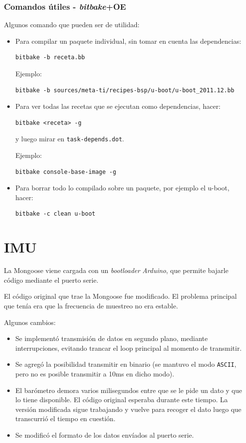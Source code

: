 \documentclass[main]{subfiles}
\begin{document}
\subsubsection{Comandos útiles - \textit{bitbake}+OE}
\label{sec:codigo:comandos-bitbake-oe}

Algunos comando que pueden ser de utilidad:

\begin{itemize}
\item Para compilar un paquete individual, sin tomar en cuenta las dependencias:
\begin{verbatim}
bitbake -b receta.bb
\end{verbatim}
Ejemplo:
\begin{verbatim}
bitbake -b sources/meta-ti/recipes-bsp/u-boot/u-boot_2011.12.bb
\end{verbatim}
\item Para ver todas las recetas que se ejecutan como dependencias, hacer:
\begin{verbatim}
bitbake <receta> -g
\end{verbatim}
y luego mirar en \verb+task-depends.dot+.

Ejemplo:
\begin{verbatim}
bitbake console-base-image -g
\end{verbatim}
\item Para borrar todo lo compilado sobre un paquete, por ejemplo el u-boot, hacer:
\begin{verbatim}
bitbake -c clean u-boot
\end{verbatim}
\end{itemize}

\section{IMU}
\label{sec:codigo:imu}

La Mongoose viene cargada con un \textit{bootloader} \textit{Arduino}, que permite bajarle código mediante el puerto serie.

El código original que trae la Mongoose fue modificado. El problema principal que tenía era que la frecuencia de muestreo no era estable.

Algunos cambios:
\begin{itemize}
\item Se implementó transmisión de datos en segundo plano, mediante interrupciones, evitando trancar el loop principal al momento de transmitir.
\item Se agregó la posibilidad transmitir en binario (se mantuvo el modo \verb+ASCII+, pero no es posible transmitir a 10ms en dicho modo).
\item El barómetro demora varios milisegundos entre que se le pide un dato y que lo tiene disponible. El código original esperaba durante este tiempo. La versión modificada sigue trabajando y vuelve para recoger el dato luego que transcurrió el tiempo en cuestión.
\item Se modificó el formato de los datos envíados al puerto serie.
\end{itemize}
\end{document}
